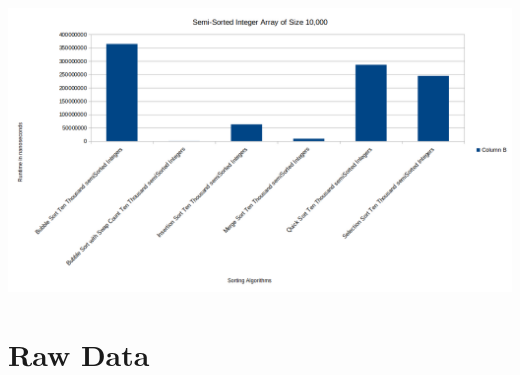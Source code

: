 \documentclass[]{article}
\begin{document}
\centerline{\includegraphics[scale=.5]{semiSorted10000}}


\section{Raw Data}
\end{document}
